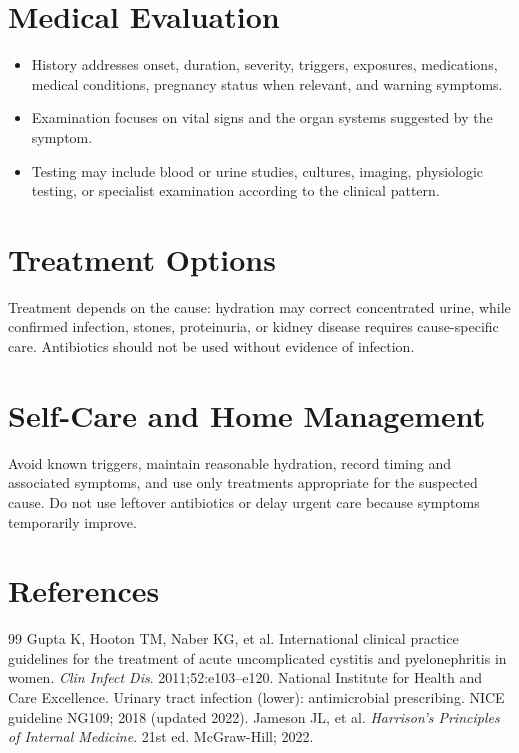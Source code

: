 \section*{Medical Evaluation}
\begin{itemize}
  \item History addresses onset, duration, severity, triggers, exposures, medications, medical conditions, pregnancy status when relevant, and warning symptoms.
  \item Examination focuses on vital signs and the organ systems suggested by the symptom.
  \item Testing may include blood or urine studies, cultures, imaging, physiologic testing, or specialist examination according to the clinical pattern.
\end{itemize}

\section*{Treatment Options}
Treatment depends on the cause: hydration may correct concentrated urine, while confirmed infection, stones, proteinuria, or kidney disease requires cause-specific care. Antibiotics should not be used without evidence of infection.

\section*{Self-Care and Home Management}
Avoid known triggers, maintain reasonable hydration, record timing and associated symptoms, and use only treatments appropriate for the suspected cause. Do not use leftover antibiotics or delay urgent care because symptoms temporarily improve.

\section*{References}
\begin{thebibliography}{99}
 Gupta K, Hooton TM, Naber KG, et al. International clinical practice guidelines for the treatment of acute uncomplicated cystitis and pyelonephritis in women. \textit{Clin Infect Dis}. 2011;52:e103--e120.
 National Institute for Health and Care Excellence. Urinary tract infection (lower): antimicrobial prescribing. NICE guideline NG109; 2018 (updated 2022).
 Jameson JL, et al. \textit{Harrison's Principles of Internal Medicine}. 21st ed. McGraw-Hill; 2022.
\end{thebibliography}
